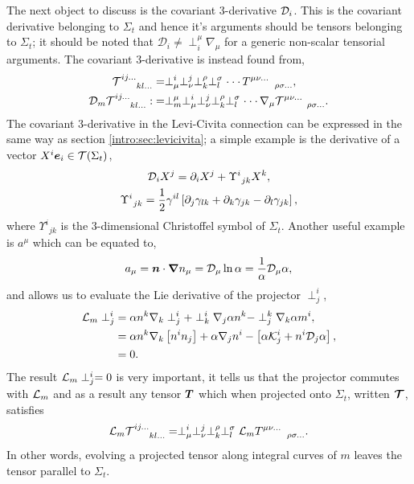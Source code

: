 The next object to discuss is the covariant 3-derivative $\mathcal{D}_i$. This is the covariant derivative belonging to $\Sigma_t$ and hence it's arguments should be tensors belonging to $\Sigma_t$; it should be noted that $\mathcal{D}_i  \neq \perp^\mu_i \nabla_\mu$ for a generic non-scalar tensorial arguments. The covariant 3-derivative is instead found from,
\begin{align} {\mathcal{T}}^{ij ...}_{\;\;\;\;\;\;\;kl ...} &=\perp^{i}_{\mu}\perp^{j}_{\nu}\perp^{\rho}_{k}\perp^{\sigma}_{l}\cdot\cdot\cdot\, T^{\mu\nu ...}_{\;\;\;\;\;\;\;\;\;\;\rho\sigma ...},\\
  \mathcal{D}_m  {\mathcal{T}}^{ij ...}_{\;\;\;\;\;\;\;kl ...} :&=   \perp^\mu_m  \perp^{i}_{\mu}\perp^{j}_{\nu}\perp^{\rho}_{k}\perp^{\sigma}_{l}\cdot\cdot\cdot\, \nabla_\mu{\mathcal{T}}^{\mu\nu ...}_{\;\;\;\;\;\;\;\;\;\;\rho\sigma ...}.\end{align}
The covariant 3-derivative in the Levi-Civita connection can be expressed in the same way as section \ref{intro:sec:levicivita}; a simple example is the derivative of a vector $X^i \boldsymbol{e}_i \in \mathcal{T}(\Sigma_t)$,
\begin{gather} \mathcal{D}_i X^j = \partial_i X^j + \Upsilon^i_{\;\,jk}X^k,\\
\Upsilon^i_{\;\,jk} = \frac{1}{2}\gamma^{il}\left[ \partial_{j}\gamma_{lk} + \partial_{k}\gamma_{jk} -\partial_{l}\gamma_{jk} \right],\label{nr:eq:3connection}\end{gather}
where $\Upsilon^i_{\;\,jk}$ is the 3-dimensional Christoffel symbol of $\Sigma_t$. Another useful example is $a^\mu$ which can be equated to,
\begin{equation}\label{nr:eq:dlnalpha} a_\mu = \boldsymbol{n}\cdot \boldsymbol{\nabla} n_\mu = \mathcal{D}_\mu \ln \alpha = \frac{1}{\alpha}\mathcal{D}_\mu \alpha,\end{equation}
and allows us to evaluate the Lie derivative of the projector $\perp^i_j$,
\begin{align}
\mathcal{L}_m \perp^i_j &= \alpha n^k \nabla_k \perp^i_j + \perp^i_k \nabla_j \alpha n^k - \perp^k_j \nabla_k \alpha m^i,  \\
&= \alpha n^k \nabla_k \left[ n^i n_j\right]  + \alpha \nabla_j n^i - \left[ \alpha \mathcal{K}_j^i + n^i \mathcal{D}_j \alpha\right], \\
&= 0.
\end{align}
The result $\mathcal{L}_m \perp^i_j=0$ is very important, it tells us that the projector commutes with $\mathcal{L}_m$ and as a result any tensor $\boldsymbol{T}$ which when projected onto $\Sigma_t$, written $\boldsymbol{\mathcal{T}}$, satisfies
\begin{equation}  \label{nr:eq:LmT}\mathcal{L}_m {\mathcal{T}}^{ij ...}_{\;\;\;\;\;\;\;kl ...} =   \perp^{i}_{\mu}\perp^{j}_{\nu}\perp^{\rho}_{k}\perp^{\sigma}_{l}\mathcal{L}_m{{T}}^{\mu\nu ...}_{\;\;\;\;\;\;\;\;\;\;\rho\sigma ...}.\end{equation} 
In other words, evolving a projected tensor along integral curves of $m$ leaves the tensor parallel to $\Sigma_t$.



